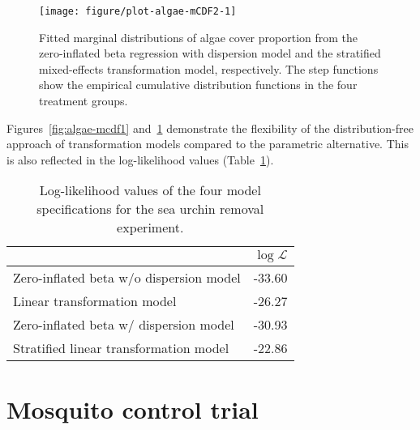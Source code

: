 \documentclass[11pt]{article}\usepackage[]{graphicx}\usepackage{xcolor}
\newenvironment{knitrout}{}{} %
\newcommand{\0}{{\mathbf{0}}}
\begin{document}
\begin{figure}[!ht]
\centering

\begin{knitrout}\small
{}\color{fgcolor}
\texttt{[image: figure/plot-algae-mCDF2-1]} 
\end{knitrout}

\caption{Fitted marginal distributions of algae cover proportion from
  the zero-inflated beta regression with dispersion model
  and the stratified mixed-effects transformation model, respectively.
  The step functions show the empirical cumulative distribution
  functions in the four treatment groups.}\label{fig:algae-mcdf2}
\end{figure}

Figures~\ref{fig:algae-mcdf1} and~\ref{fig:algae-mcdf2}
demonstrate the flexibility of the distribution-free
approach of transformation models compared
to the parametric alternative.
This is also reflected in the log-likelihood values (Table~\ref{tbl:ll-algae}).

\begin{table}[!ht]
\centering
\caption{Log-likelihood values of the four model specifications
  for the sea urchin removal experiment.
}\label{tbl:ll-algae}

\begin{tabular}{lr}
  \toprule
 & $\log\mathcal{L}$ \\ 
  \midrule
Zero-inflated beta w/o dispersion model & -33.60 \\ 
  Linear transformation model & -26.27 \\ 
  Zero-inflated beta w/ dispersion model & -30.93 \\ 
  Stratified linear transformation model & -22.86 \\ 
   \bottomrule
\end{tabular}


\end{table}

\section{Mosquito control trial}
\end{document}
